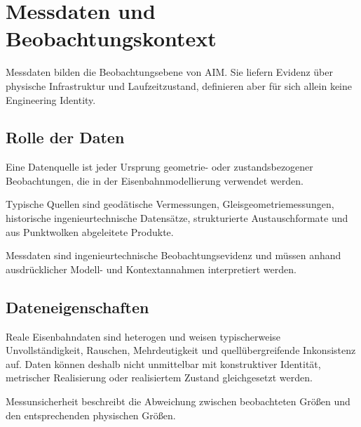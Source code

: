 
\chapter{Messdaten und Beobachtungskontext}
\label{chap:reality-data}


Messdaten bilden die Beobachtungsebene von AIM. Sie liefern Evidenz über
physische Infrastruktur und Laufzeitzustand, definieren aber für sich allein
keine Engineering Identity.

\section{Rolle der Daten}

\begin{definition}[Datenquelle]
Eine Datenquelle ist jeder Ursprung geometrie- oder zustandsbezogener
Beobachtungen, die in der Eisenbahnmodellierung verwendet werden.
\end{definition}

Typische Quellen sind geodätische Vermessungen, Gleisgeometriemessungen,
historische ingenieurtechnische Datensätze, strukturierte Austauschformate und
aus Punktwolken abgeleitete Produkte.

\begin{principle}[Beobachtungsprinzip]
Messdaten sind ingenieurtechnische Beobachtungsevidenz und müssen anhand
ausdrücklicher Modell- und Kontextannahmen interpretiert werden.
\end{principle}

\section{Dateneigenschaften}

Reale Eisenbahndaten sind heterogen und weisen typischerweise
Unvollständigkeit, Rauschen, Mehrdeutigkeit und quellübergreifende
Inkonsistenz auf. Daten können deshalb nicht unmittelbar mit konstruktiver
Identität, metrischer Realisierung oder realisiertem Zustand gleichgesetzt
werden.

\begin{definition}[Messunsicherheit]
Messunsicherheit beschreibt die Abweichung zwischen beobachteten Größen und
den entsprechenden physischen Größen.
\end{definition}

